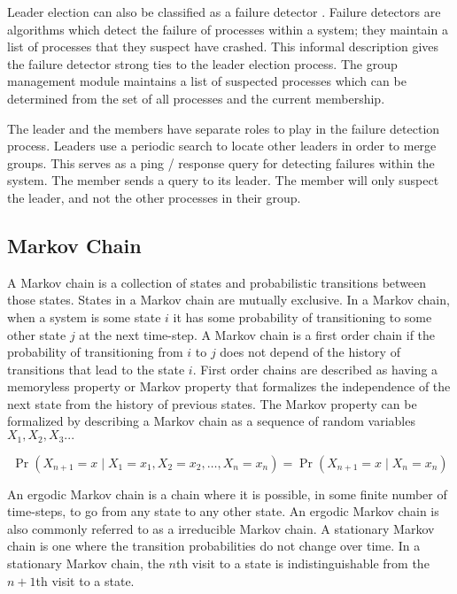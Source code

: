 Leader election can also be classified as a failure detector \cite{LEADERELECTIONEVAL}.
Failure detectors are algorithms which detect the failure of processes within a system; they maintain a list of processes that they suspect have crashed.
This informal description gives the failure detector strong ties to the leader election process. 
The group management module maintains a list of suspected processes which can be determined from the set of all processes and the current membership.

The leader and the members have separate roles to play in the failure detection process.
Leaders use a periodic search to locate other leaders in order to merge groups.
This serves as a ping / response query for detecting failures within the system.
The member sends a query to its leader.
The member will only suspect the leader, and not the other processes in their group.

\subsection{Markov Chain}


A Markov chain is a collection of states and probabilistic transitions between those states.
States in a Markov chain are mutually exclusive.
In a Markov chain, when a system is some state $i$ it has some probability of transitioning to some other state $j$ at the next time-step.
A Markov chain is a first order chain if the probability of transitioning from $i$ to $j$ does not depend of the history of transitions that lead to the state $i$.
First order chains are described as having a memoryless property or Markov property that formalizes the independence of the next state from the history of previous states.
The Markov property can be formalized by describing a Markov chain as a sequence of random variables $X_{1}, X_{2}, X_{3}...$

\[ \Pr(X_{n+1}=x\mid X_1=x_1, X_2=x_2, \ldots, X_n=x_n) = \Pr(X_{n+1}=x\mid X_n=x_n) \]

An ergodic Markov chain is a chain where it is possible, in some finite number of time-steps, to go from any state to any other state.
An ergodic Markov chain is also commonly referred to as a irreducible Markov chain.
A stationary Markov chain is one where the transition probabilities do not change over time.
In a stationary Markov chain, the $n$th visit to a state is indistinguishable from the $n+1$th visit to a state.

